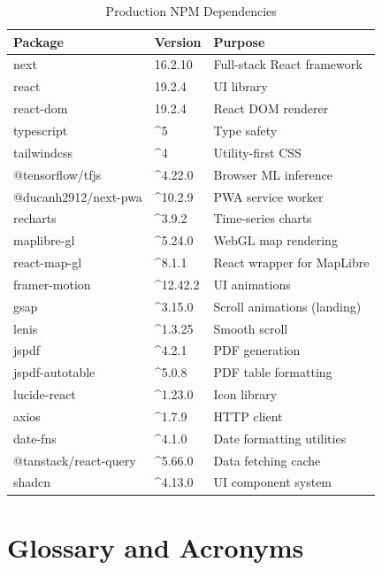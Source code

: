 \begin{table}[H]
\centering
\caption{Production NPM Dependencies}
\begin{tabularx}{\linewidth}{|l|l|X|}
\hline
\rowcolor{FloodLight}
\textbf{Package} & \textbf{Version} & \textbf{Purpose} \\
\hline
next & 16.2.10 & Full-stack React framework \\
react & 19.2.4 & UI library \\
react-dom & 19.2.4 & React DOM renderer \\
typescript & \^{}5 & Type safety \\
tailwindcss & \^{}4 & Utility-first CSS \\
@tensorflow/tfjs & \^{}4.22.0 & Browser ML inference \\
@ducanh2912/next-pwa & \^{}10.2.9 & PWA service worker \\
recharts & \^{}3.9.2 & Time-series charts \\
maplibre-gl & \^{}5.24.0 & WebGL map rendering \\
react-map-gl & \^{}8.1.1 & React wrapper for MapLibre \\
framer-motion & \^{}12.42.2 & UI animations \\
gsap & \^{}3.15.0 & Scroll animations (landing) \\
lenis & \^{}1.3.25 & Smooth scroll \\
jspdf & \^{}4.2.1 & PDF generation \\
jspdf-autotable & \^{}5.0.8 & PDF table formatting \\
lucide-react & \^{}1.23.0 & Icon library \\
axios & \^{}1.7.9 & HTTP client \\
date-fns & \^{}4.1.0 & Date formatting utilities \\
@tanstack/react-query & \^{}5.66.0 & Data fetching cache \\
shadcn & \^{}4.13.0 & UI component system \\
\hline
\end{tabularx}
\end{table}

\chapter{Glossary and Acronyms}
\label{app:glossary}

